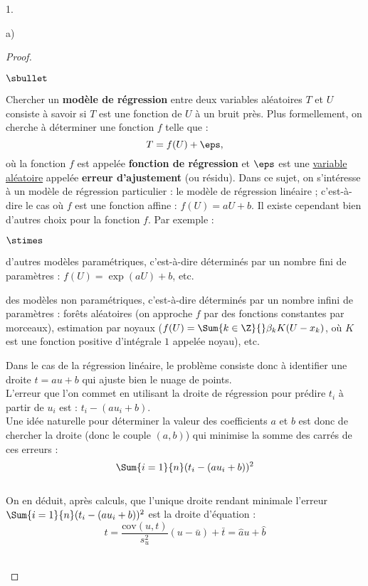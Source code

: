 \begin{noliste}{1.}
\begin{noliste}{a)}
\begin{proof}
   \begin{remark}
   \begin{noliste}{$\sbullet$}
    \item Chercher un {\bf modèle de régression} entre deux
    variables aléatoires $T$ et $U$ 
    consiste à savoir si $T$ est une fonction de $U$ à un bruit près. 
    Plus formellement, on cherche à
    déterminer une fonction $f$ telle que :
    \[
    T=f(U)+\eps,
    \]
    où la fonction $f$ est appelée {\bf fonction de régression} et
    $\eps$ est une \underline{variable aléatoire} appelée {\bf erreur
      d'ajustement} (ou résidu).
    Dans ce sujet, on s'intéresse à un modèle de régression particulier 
    : le modèle de régression linéaire ;
    c'est-à-dire le cas où $f$ est une fonction affine : $f(U)=aU+b$. Il
    existe cependant bien d'autres choix pour la fonction $f$. Par
    exemple :
    \begin{noliste}{$\stimes$}
    \item d'autres modèles paramétriques, c'est-à-dire déterminés par un
      nombre fini de paramètres : $f(U)=\exp(aU)+b$, etc.
    \item des modèles non paramétriques, c'est-à-dire déterminés par un
      nombre infini de paramètres : forêts aléatoires (on approche $f$
      par des fonctions constantes par morceaux), estimation par noyaux
      ($f(U)=\Sum{k\in\Z}{} \beta_k K(U-x_k)$, où $K$ est une fonction
      positive d'intégrale $1$ appelée noyau), etc.
    \end{noliste}
    
    \item Dans le cas de la régression linéaire, le problème 
    consiste donc à identifier une droite $t=au+b$ qui ajuste bien 
    le nuage de points.\\
    L'erreur que l'on commet en utilisant la droite de régression pour
    prédire $t_i$ à partir de $u_i$ est : $t_i - (au_i +b)$.\\
    Une idée naturelle pour déterminer la valeur des coefficients $a$ 
    et $b$ est donc de chercher la droite (donc le couple $(a,b)$)
    qui minimise la somme des carrés de ces erreurs :~\\[-.2cm]
    \[
     \Sum{i=1}{n} (t_i - (a u_i +b))^2
    \]~\\[-.4cm]
    On en déduit, après calculs, que l'unique droite rendant minimale
    l'erreur $\Sum{i=1}{n} (t_i - (a u_i +b))^2$ est la droite 
    d'équation :~\\[-.2cm]
    \[
     t = \dfrac{\text{cov}(u,t)}{s_u^2} (u- \bar{u}) + \bar{t}
     = \hat{a} u + \hat{b}
    \]
   \end{noliste}
   \end{remark}~\\[-1.4cm]
  \end{proof}
  

\end{noliste}
\end{noliste}
